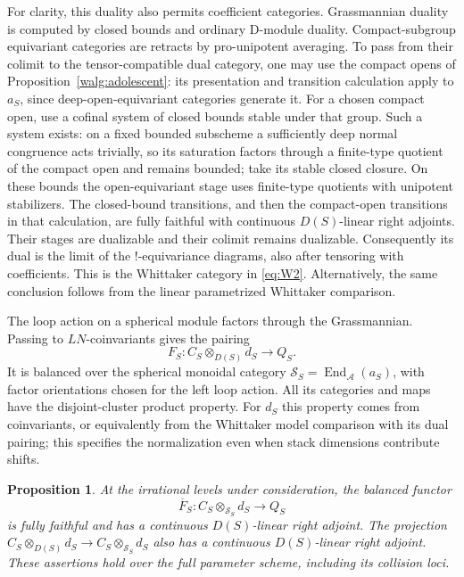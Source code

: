 \documentclass[11pt]{article}
\numberwithin{equation}{section}
\newtheorem{proposition}[theorem]{Proposition}
\theoremstyle{definition}
\theoremstyle{remark}
\begin{document}
For clarity, this duality also permits coefficient categories.
Grassmannian duality is computed by closed bounds and ordinary
D-module duality.  Compact-subgroup equivariant categories are
retracts by pro-unipotent averaging.  To pass from their colimit to
the tensor-compatible dual category, one may use the compact opens
of Proposition~\ref{walg:adolescent}: its presentation and transition
calculation apply to $a_S$, since deep-open-equivariant categories
generate it.
For a chosen compact open, use a cofinal system of closed bounds
stable under that group.  Such a system exists: on a fixed bounded
subscheme a sufficiently deep normal congruence acts trivially,
so its saturation factors through a finite-type quotient of the
compact open and remains bounded; take its stable closed closure.
On these bounds the open-equivariant stage uses finite-type
quotients with unipotent stabilizers.  The closed-bound transitions,
and then the compact-open transitions in that calculation, are
fully faithful with continuous $D(S)$-linear right adjoints.
Their stages are dualizable and their colimit remains dualizable.
Consequently its dual is the limit of the !-equivariance diagrams,
also after tensoring with coefficients.  This is the Whittaker
category in \eqref{eq:W2}.  Alternatively, the same conclusion
follows from the linear parametrized Whittaker comparison.

The loop action on a spherical module factors through the
Grassmannian.  Passing to $LN$-coinvariants gives the pairing
\begin{equation}\label{eq:L3}
                     F_S:C_S\otimes_{D(S)}d_S\longrightarrow Q_S.
\end{equation}
It is balanced over the spherical monoidal category
$\mathcal S_S=\operatorname{End}_{\mathcal A}(a_S)$, with factor
orientations chosen for the left loop action.  All its categories
and maps have the disjoint-cluster product property.  For $d_S$
this property comes from coinvariants, or equivalently from the
Whittaker model comparison with its dual pairing; this specifies
the normalization even when stack dimensions contribute shifts.

\begin{proposition}\label{loop:pairing-adjoints}
At the irrational levels under consideration, the balanced functor
\[
               \overline F_S:
               C_S\otimes_{\mathcal S_S}d_S\longrightarrow Q_S
\]
is fully faithful and has a continuous $D(S)$-linear right adjoint.
The projection
$C_S\otimes_{D(S)}d_S\to C_S\otimes_{\mathcal S_S}d_S$
also has a continuous $D(S)$-linear right adjoint.
These assertions hold over the full parameter scheme, including
its collision loci.
\end{proposition}
\end{document}
